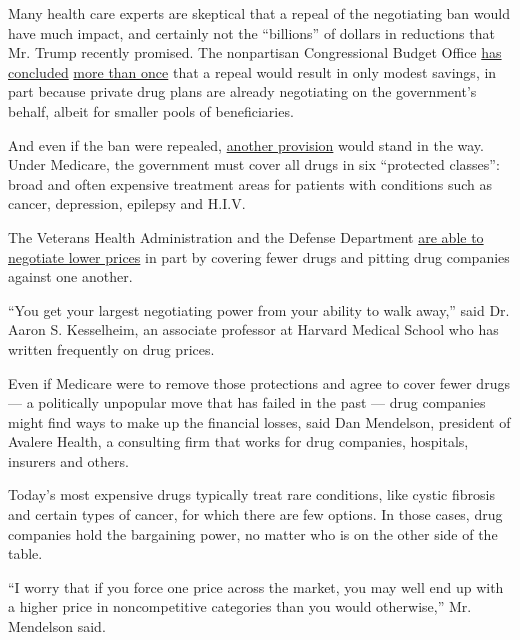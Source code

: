 Many health care experts are skeptical that a repeal of the negotiating
ban would have much impact, and certainly not the ``billions'' of
dollars in reductions that Mr. Trump recently promised. The nonpartisan
Congressional Budget Office
\href{https://www.cbo.gov/sites/default/files/114th-congress-2015-2016/dataandtechnicalinformation/51431-HealthPolicy.pdf}{has
concluded}
\href{https://www.cbo.gov/sites/default/files/110th-congress-2007-2008/reports/drugpricenegotiation.pdf}{more
than once} that a repeal would result in only modest savings, in part
because private drug plans are already negotiating on the government's
behalf, albeit for smaller pools of beneficiaries.

And even if the ban were repealed,
\href{https://www.nytimes.com/2016/02/02/upshot/the-real-reason-medicare-is-a-lousy-drug-negotiator-it-cant-say-no.html}{another
provision} would stand in the way. Under Medicare, the government must
cover all drugs in six ``protected classes'': broad and often expensive
treatment areas for patients with conditions such as cancer, depression,
epilepsy and H.I.V.

The Veterans Health Administration and the Defense Department
\href{http://www.commonwealthfund.org/publications/blog/2016/may/drug-price-control-how-some-government-programs-do-it}{are
able to negotiate lower prices} in part by covering fewer drugs and
pitting drug companies against one another.

``You get your largest negotiating power from your ability to walk
away,'' said Dr. Aaron S. Kesselheim, an associate professor at Harvard
Medical School who has written frequently on drug prices.

Even if Medicare were to remove those protections and agree to cover
fewer drugs --- a politically unpopular move that has failed in the past
--- drug companies might find ways to make up the financial losses, said
Dan Mendelson, president of Avalere Health, a consulting firm that works
for drug companies, hospitals, insurers and others.

Today's most expensive drugs typically treat rare conditions, like
cystic fibrosis and certain types of cancer, for which there are few
options. In those cases, drug companies hold the bargaining power, no
matter who is on the other side of the table.

``I worry that if you force one price across the market, you may well
end up with a higher price in noncompetitive categories than you would
otherwise,'' Mr. Mendelson said.

